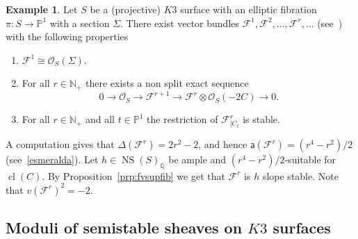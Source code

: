 \documentclass[11pt]{amsart}
\newcommand{\NN}{{\mathbb N}}
\newcommand{\PP}{{\mathbb P}}
\newcommand{\QQ}{{\mathbb Q}}
\let\mathcal\mathscr
\def\cF{\mathcal{F}}
\def\cO{\mathcal{O}}
\DeclareMathOperator{\cl}{cl}
\DeclareMathOperator{\NS}{NS}
\def\lra{\longrightarrow}
\theoremstyle{definition}
\newtheorem{expl}[lmm]{Example}
\theoremstyle{remark}
\begin{document}
\begin{expl}\label{expl:rigidisuk3ell}
%
Let $S$ be a (projective) $K3$ surface with  an elliptic fibration $\pi\colon S\to\PP^1$ with a section $\Sigma$. There exist  vector bundles $\cF^1,\cF^2,\ldots,\cF^r,\ldots$ 
(see~\cite{og:accaduespmod}) with the following properties
%
\begin{enumerate}
%
\item
%
$\cF^1\cong\cO_S(\Sigma)$.
%
\item
%
For all $r\in\NN_{+}$ there exists a non split exact sequence
%
\begin{equation*}
%
0\lra\cO_S\lra \cF^{r+1}\lra  \cF^{r}\otimes\cO_S(-2C)\lra 0.
%
\end{equation*}
%
%
\item
%
For all $r\in\NN_{+}$ and all $t\in\PP^1$  the restriction of $\cF^r_{|C_t}$ is stable. 
%
\end{enumerate}
%
A computation gives that $\Delta(\cF^r)=2r^2-2$, and hence ${\mathsf a}(\cF^r)=(r^4-r^2)/2$ (see~\eqref{esmeralda}). Let $h\in\NS(S)_{\QQ}$  be 
ample and $(r^4-r^2)/2$-suitable for $\cl(C)$. By 
Proposition~\ref{prp:fvsupfib} we get that $\cF^r$ is $h$ slope stable. Note that $v(\cF^r)^2=-2$.
%
\end{expl}
%

%
\subsection{Moduli of semistable sheaves on $K3$ surfaces}
%
%
\setcounter{equation}{0}
%
%
\end{document}
